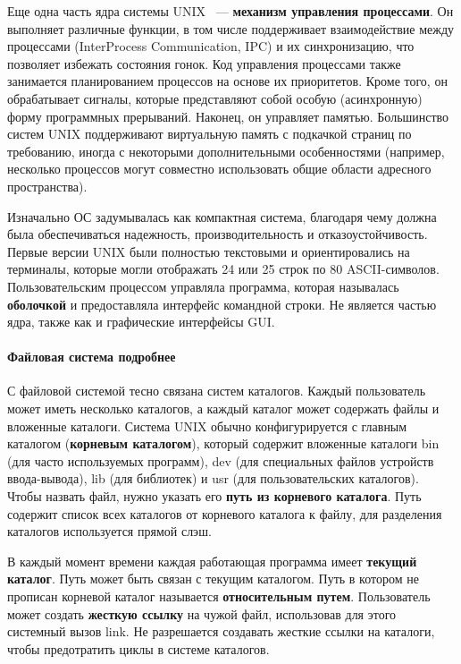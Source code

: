 \documentclass[10pt]{article}
\begin{document}
	Еще одна часть ядра системы UNIX ~--- \textbf{механизм управления процессами}. Он выполняет различные функции, в том числе поддерживает взаимодействие между процессами (InterProcess Communication, IPC) и их синхронизацию, что позволяет избежать состояния гонок. Код управления процессами также занимается планированием процессов на основе их приоритетов. Кроме того, он обрабатывает сигналы, которые представляют собой особую (асинхронную) форму программных прерываний. Наконец, он управляет памятью. Большинство систем UNIX поддерживают виртуальную память с подкачкой страниц по требованию, иногда с некоторыми дополнительными особенностями (например, несколько процессов могут совместно использовать общие области адресного пространства).

	Изначально ОС задумывалась как компактная система, благодаря чему должна была обеспечиваться надежность, производительность и отказоустойчивость. Первые версии UNIX были полностью текстовыми и ориентировались на терминалы, которые могли отображать 24 или 25 строк по 80 ASCII-символов. Пользовательским процессом управляла программа, которая называлась \textbf{оболочкой} и предоставляла интерфейс командной строки. Не является частью ядра, также как и графические интерфейсы GUI.
	\paragraph{Файловая система подробнее}
	С файловой системой тесно связана систем каталогов. Каждый пользователь может иметь несколько каталогов, а каждый каталог может содержать файлы и вложенные каталоги. Система UNIX обычно конфигурируется с главным каталогом (\textbf{корневым каталогом}), который содержит вложенные каталоги bin (для часто используемых программ), dev (для специальных файлов устройств ввода-вывода), lib (для библиотек) и usr (для пользовательских каталогов). Чтобы назвать файл, нужно указать его \textbf{путь из корневого каталога}. Путь содержит список всех каталогов от корневого каталога к файлу, для разделения каталогов используется прямой слэш.

	В каждый момент времени каждая работающая программа имеет \textbf{текущий каталог}. Путь может быть связан с текущим каталогом. Путь в котором не прописан корневой каталог называется \textbf{относительным путем}. Пользователь может создать \textbf{ жесткую ссылку} на чужой файл, использовав для этого системный вызов link. Не разрешается создавать жесткие ссылки на каталоги, чтобы предотратить циклы в системе каталогов.
\end{document}
